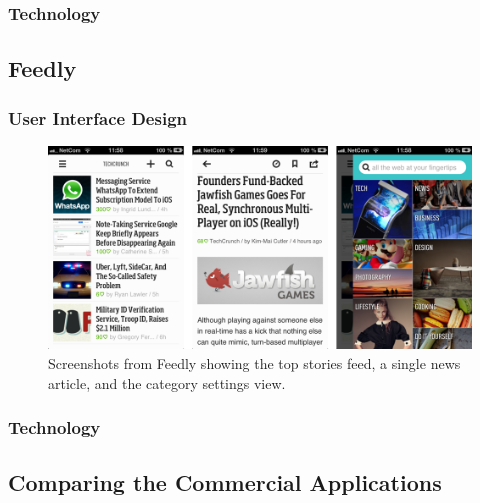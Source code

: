 \subsubsection{Technology}


\subsection{Feedly}

\subsubsection{User Interface Design}

\begin{figure}[!htbp]
\centering
\includegraphics[width=130mm]{GFX/screenshots/feedly.png}
\caption{Screenshots from Feedly showing the top stories feed, a single news article, and the category settings view.}
\label{screenshots_feedly}
\end{figure}

\subsubsection{Technology}


\subsection{Comparing the Commercial Applications}

